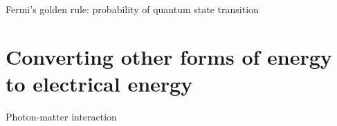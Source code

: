 


Fermi's golden rule:
probability of quantum state transition



\section{Converting other forms of energy to electrical energy}


Photon-matter interaction


